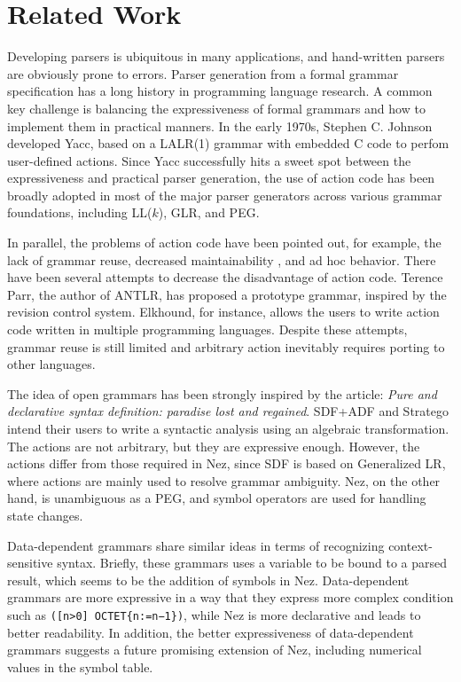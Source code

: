 \documentclass[preprint]{sigplanconf}
\begin{document}
\section{Related Work} \label{sec:relatedwork}

Developing parsers is ubiquitous in many applications, and hand-written parsers are obviously prone to errors. 
Parser generation from a formal grammar specification has a long history in programming language research. A common key challenge is balancing the expressiveness of formal grammars and how to implement them in practical manners. In the early 1970s, Stephen C. Johnson developed Yacc\cite{Yacc}, based on a LALR(1) grammar with embedded C code to perfom user-defined actions. Since Yacc successfully hits a sweet spot between the expressiveness and practical parser generation, the use of action code has been broadly adopted in most of the major parser generators \cite{PLDI11_Antlr,OOPSLA10_ParadiseLost,OOPSLA14_ParserCombinator} across various grammar foundations, including LL($k$), GLR, and PEG.

In parallel, the problems of action code have been pointed out, for example, the lack of grammar reuse\cite{ICPC08_SemanticActions}, decreased maintainability \cite{LDTA10_DSL}, and ad hoc behavior\cite{POPL13_Indentation}. There have been several attempts to decrease the disadvantage of action code. 
Terence Parr, the author of ANTLR, has proposed a prototype grammar, inspired by the revision control system\cite{ICPC08_SemanticActions}. Elkhound\cite{CC04_Elkhound}, for instance, allows the users to write action code written in multiple programming languages. 
Despite these attempts, grammar reuse is still limited and arbitrary action inevitably requires porting to other languages. 

The idea of open grammars has been strongly inspired by the article: {\em Pure and declarative syntax definition: paradise lost and regained}\cite{OOPSLA10_ParadiseLost}. SDF+ADF and Stratego\cite{MetaBorg,SCP08_Stratego} intend their users to write a syntactic analysis using an algebraic transformation. The actions are not arbitrary, but  they are expressive enough. However, the actions differ from those required in Nez, since SDF is based on Generalized LR\cite{PHD97_SGLR}, where actions are mainly used to resolve grammar ambiguity. Nez, on the other hand, is unambiguous as a PEG, and symbol operators are used for handling state changes. 

Data-dependent grammars \cite{POPL10_Yakker,ONWARD15_Iguana} share similar ideas in terms of recognizing context-sensitive syntax. Briefly, these grammars uses a variable to be bound to a parsed result, which seems to be the addition of symbols in Nez. Data-dependent grammars are more expressive in a way that they express more complex condition such as \verb|([n>0] OCTET{n:=n−1})|, while Nez is more declarative and leads to better readability. In addition, the better expressiveness of data-dependent grammars suggests a future promising extension of Nez, including numerical values in the symbol table.
\end{document}
